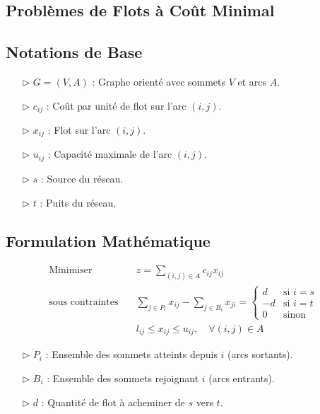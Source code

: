 \documentclass{report}
\begin{document}
\begin{multicols*}{2}
\section*{Problèmes de Flots à Coût Minimal}

\subsection*{Notations de Base}

\begin{itemize}
    \item[$\rhd$] \( G = (V, A) \) : Graphe orienté avec sommets \( V \) et arcs \( A \).
    \item[$\rhd$] \( c_{ij} \) : Coût par unité de flot sur l'arc \( (i, j) \).
    \item[$\rhd$] \( x_{ij} \) : Flot sur l'arc \( (i, j) \).
    \item[$\rhd$] \( u_{ij} \) : Capacité maximale de l'arc \( (i, j) \).
    \item[$\rhd$] \( s \) : Source du réseau.
    \item[$\rhd$] \( t \) : Puits du réseau.
\end{itemize}

\subsection*{Formulation Mathématique}

\begin{align*}
\text{Minimiser} \quad & z = \sum_{(i,j) \in A} c_{ij} x_{ij} \\
\text{sous contraintes} \quad & \sum_{j \in P_i} x_{ij} - \sum_{j \in B_i} x_{ji} =
\begin{cases}
d & \text{si } i = s \\
-d & \text{si } i = t \\
0 & \text{sinon}
\end{cases} \\
& l_{ij} \leq x_{ij} \leq u_{ij}, \quad \forall (i,j) \in A
\end{align*}

\begin{itemize}
    \item[$\rhd$] \( P_i \) : Ensemble des sommets atteints depuis \( i \) (arcs sortants).
    \item[$\rhd$] \( B_i \) : Ensemble des sommets rejoignant \( i \) (arcs entrants).
    \item[$\rhd$] \( d \) : Quantité de flot à acheminer de \( s \) vers \( t \).
\end{itemize}


\end{multicols*}
\end{document}

